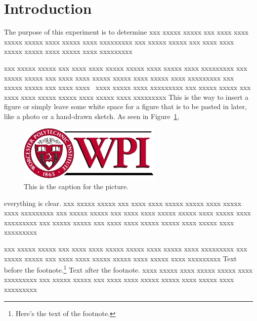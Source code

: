 \documentclass[12pt]{article}
\begin{document}
    
    
    
    \tableofcontents
    \clearpage 

    \section{Introduction}
    The purpose of this experiment is to determine 
    xxx xxxxx xxxxx xxx xxxx xxxx xxxxx xxxxx xxxx xxxxx xxxx xxxxxxxxx
    xxx xxxxx xxxxx xxx xxxx xxxx xxxxx xxxxx xxxx xxxxx xxxx xxxxxxxxx
     
    xxx xxxxx xxxxx xxx xxxx xxxx xxxxx xxxxx xxxx xxxxx xxxx xxxxxxxxx
    xxx xxxxx xxxxx xxx xxxx xxxx xxxxx xxxxx xxxx xxxxx xxxx xxxxxxxxx
    xxx xxxxx xxxxx xxx xxxx xxxx~\cite{adams1995hitchhiker} xxxx xxxxx xxxx xxxxxxxxx 
    xxx xxxxx xxxxx xxx xxxx xxxx xxxxx xxxxx xxxx xxxxx xxxx xxxxxxxxx
    This is the way to insert a figure or simply 
    leave some white space for a figure that is to be 
    pasted in later, like a photo or a hand-drawn sketch.  As seen in
    Figure~\ref{fig:picture}, 
    
        \begin{figure}
        \begin{center}
        \includegraphics{wpi_logo.jpg}
        \end{center}
        \caption{This is the caption for the picture.}
        \label{fig:picture}
        \end{figure}
    
    everything is clear.
    xxx xxxxx xxxxx xxx xxxx xxxx xxxxx xxxxx xxxx xxxxx xxxx xxxxxxxxx
    xxx xxxxx xxxxx xxx xxxx xxxx xxxxx xxxxx xxxx xxxxx xxxx xxxxxxxxx
    xxx xxxxx xxxxx xxx xxxx xxxx xxxxx xxxxx xxxx xxxxx xxxx xxxxxxxxx
    
    xxx xxxxx xxxxx xxx xxxx xxxx xxxxx xxxxx xxxx xxxxx xxxx xxxxxxxxx
    xxx xxxxx xxxxx xxx xxxx xxxx xxxxx xxxxx xxxx xxxxx xxxx xxxxxxxxx
    Text before the footnote.\footnote{Here's the text of the footnote.}
    Text after the footnote. xxxx xxxxx xxxx xxxxx xxxxx xxxx xxxxxxxxx
    xxx xxxxx xxxxx xxx xxxx xxxx xxxxx xxxxx xxxx xxxxx xxxx xxxxxxxxx
\end{document}
